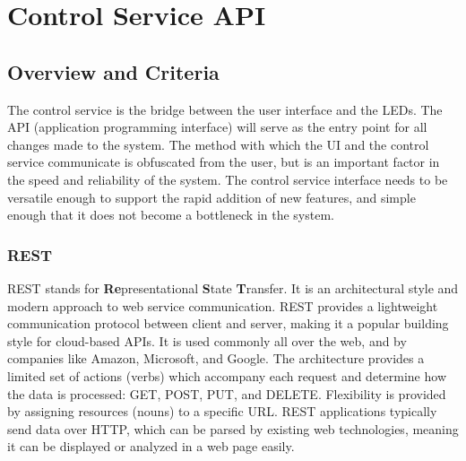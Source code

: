 \documentclass[onecolumn, draftclsnofoot,10pt, compsoc]{IEEEtran}
\begin{document}
\newpage

\tableofcontents
\clearpage
\singlespace

\newpage





	\section{Control Service API}
		\subsection{Overview and Criteria}
		The control service is the bridge between the user interface and the LEDs.
		The API (application programming interface) will serve as the entry point for all changes made to the system.
		The method with which the UI and the control service communicate is obfuscated from the user, but is an important factor in the speed and reliability of the system.
		The control service interface needs to be versatile enough to support the rapid addition of new features, and simple enough that it does not become a bottleneck in the system.

		\subsubsection{REST}
		REST stands for \textbf{Re}presentational \textbf{S}tate \textbf{T}ransfer.
		It is an architectural style and modern approach to web service communication. \cite[ch.5]{rest1}
		REST provides a lightweight communication protocol between client and server,
		making it a popular building style for cloud-based APIs.
		It is used commonly all over the web, and by companies like Amazon, Microsoft, and Google. \cite{rest2}
		The architecture provides a limited set of actions (verbs) which accompany each request and determine how the data is processed: GET, POST, PUT, and DELETE.
		Flexibility is provided by assigning resources (nouns) to a specific URL.
		REST applications typically send data over HTTP, which can be parsed by existing web technologies, meaning it can be displayed or analyzed in a web page easily.
\end{document}
